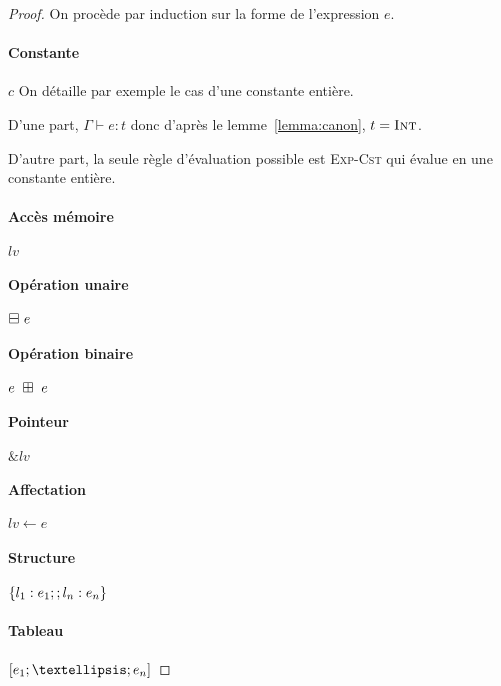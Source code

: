 \begin{proof}

On procède par induction sur la forme de l'expression $e$.

\paragraph{ Constante }             $c$ %
On détaille par exemple le cas d'une constante entière.

D'une part, $Γ ⊢ e : t$ donc d'après le lemme~\ref{lemma:canon}, $t = \textsc{Int}$.

D'autre part, la seule règle d'évaluation possible est \textsc{Exp-Cst} qui
évalue en une constante entière.


\paragraph{ Accès mémoire }         $ lv $ %

\paragraph{ Opération unaire }      $ \boxminus~e $ %


\paragraph{ Opération binaire }     $ e~\boxplus~e $ %

\paragraph{ Pointeur }              $ \& lv $ %

\paragraph{ Affectation }           $ lv ← e $ %

\paragraph{ Structure }             $ \{ l_1 : e_1 ; ; l_n : e_n \} $ %

\paragraph{ Tableau }               $ \eArray{e_1 ;…; e_n} $ %


\end{proof}
